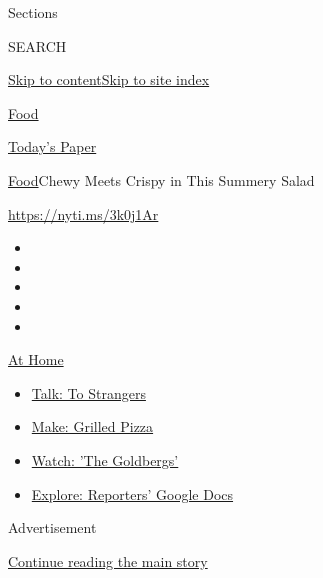 Sections

SEARCH

\protect\hyperlink{site-content}{Skip to
content}\protect\hyperlink{site-index}{Skip to site index}

\href{https://www.nytimes.com/section/food}{Food}

\href{https://myaccount.nytimes.com/auth/login?response_type=cookie\&client_id=vi}{}

\href{https://www.nytimes.com/section/todayspaper}{Today's Paper}

\href{/section/food}{Food}\textbar{}Chewy Meets Crispy in This Summery
Salad

\url{https://nyti.ms/3k0j1Ar}

\begin{itemize}
\item
\item
\item
\item
\item
\end{itemize}

\href{https://www.nytimes.com/spotlight/at-home?action=click\&pgtype=Article\&state=default\&region=TOP_BANNER\&context=at_home_menu}{At
Home}

\begin{itemize}
\tightlist
\item
  \href{https://www.nytimes.com/2020/08/03/well/family/the-benefits-of-talking-to-strangers.html?action=click\&pgtype=Article\&state=default\&region=TOP_BANNER\&context=at_home_menu}{Talk:
  To Strangers}
\item
  \href{https://www.nytimes.com/2020/08/01/at-home/coronavirus-make-pizza-on-a-grill.html?action=click\&pgtype=Article\&state=default\&region=TOP_BANNER\&context=at_home_menu}{Make:
  Grilled Pizza}
\item
  \href{https://www.nytimes.com/2020/07/31/arts/television/goldbergs-abc-stream.html?action=click\&pgtype=Article\&state=default\&region=TOP_BANNER\&context=at_home_menu}{Watch:
  'The Goldbergs'}
\item
  \href{https://www.nytimes.com/interactive/2020/at-home/even-more-reporters-editors-diaries-lists-recommendations.html?action=click\&pgtype=Article\&state=default\&region=TOP_BANNER\&context=at_home_menu}{Explore:
  Reporters' Google Docs}
\end{itemize}

Advertisement

\protect\hyperlink{after-top}{Continue reading the main story}

